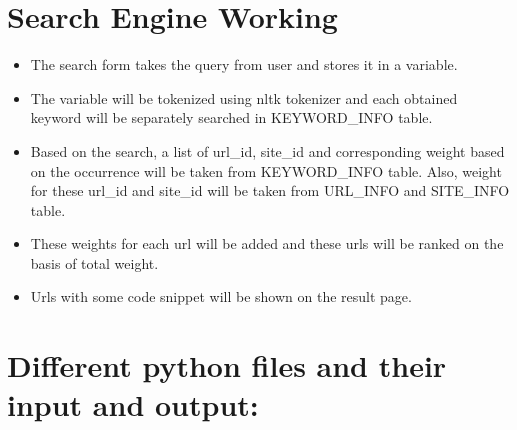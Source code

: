 \documentclass{scrreprt}
\begin{document}
\section{Search Engine Working}
    \begin{itemize}
      \item The search form takes the query from user and stores it in a variable. 
\item The variable will be tokenized using nltk tokenizer and each obtained keyword will be separately searched in KEYWORD_INFO table.
\item Based on the search, a list of url_id, site_id and corresponding weight based on the occurrence will be taken from KEYWORD_INFO table. Also, weight for these url_id and site_id will be taken from URL_INFO and SITE_INFO table.
\item These weights for each url will be added and these urls will be ranked on the basis of total weight.
\item Urls with some code snippet will be shown on the result page.

    \end{itemize}


\section{Different python files and their input and output:}
\end{document}
